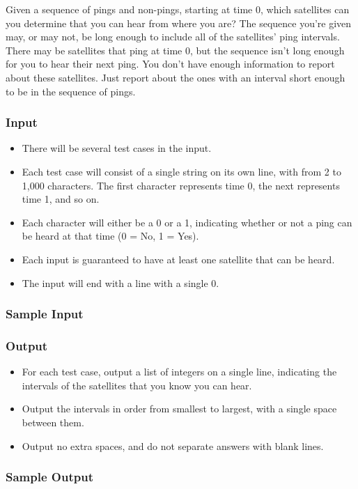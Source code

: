 Given a sequence of pings and non-pings, starting at time 0, which satellites can you determine that you can hear from where you are?
The sequence you're given may, or may not, be long enough to include all of the satellites' ping intervals.
There may be satellites that ping at time 0, but the sequence isn't long enough for you to hear their next ping.
You don't have enough information to report about these satellites.
Just report about the ones with an interval short enough to be in the sequence of pings.

\subsubsection{Input}
\begin{itemize}
	\item There will be several test cases in the input.
	\item Each test case will consist of a single string on its own line, with from 2 to 1,000 characters.
	The first character represents time 0, the next represents time 1, and so on.
	\item Each character will either be a 0 or a 1, indicating whether or not a ping can be heard at that time (0 = No, 1 = Yes).
	\item Each input is guaranteed to have at least one satellite that can be heard.
	\item The input will end with a line with a single 0.
\end{itemize}

\subsubsection{Sample Input}

\subsubsection{Output}
\begin{itemize}
	\item For each test case, output a list of integers on a single line, indicating the intervals of the satellites that you know you can hear.
	\item Output the intervals in order from smallest to largest, with a single space between them.
	\item Output no extra spaces, and do not separate answers with blank lines.
\end{itemize}

\subsubsection{Sample Output}
